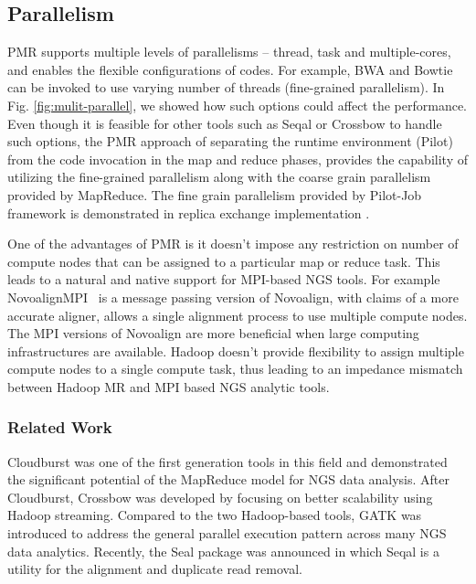 \documentclass{acm_proc_article-sp}
\begin{document}
\subsection{Parallelism} 
PMR supports multiple levels of parallelisms -- thread, task and
multiple-cores, and enables the flexible configurations of codes. For
example, BWA and Bowtie can be invoked to use varying number of
threads (fine-grained parallelism).  In Fig. \ref{fig:mulit-parallel},
we showed how such options could affect the performance.  Even
though it is feasible for other tools such as Seqal or Crossbow to
handle such options, the PMR approach of separating the runtime
environment (Pilot) from the code invocation in the map and reduce
phases, provides the capability of utilizing the fine-grained
parallelism along with the coarse grain parallelism provided by
MapReduce. The fine grain parallelism provided by Pilot-Job framework is demonstrated in replica exchange implementation \cite{repex_ptrsa}.

One of the advantages of PMR is it doesn't impose any restriction on
number of compute nodes that can be assigned to a particular map or
reduce task. This leads to a natural and native support for MPI-based
NGS tools. For example NovoalignMPI~\cite{novo-align} is a message
passing version of Novoalign, with claims of a more accurate aligner,
allows a single alignment process to use multiple compute nodes. The
MPI versions of Novoalign are more beneficial when large computing
infrastructures are available. Hadoop doesn't provide flexibility to
assign multiple compute nodes to a single compute task, thus leading
to an impedance mismatch between Hadoop MR and MPI based NGS analytic
tools.


\subsubsection*{Related Work}

Cloudburst was one of the first generation tools in this field and
demonstrated the significant potential of the MapReduce model for NGS
data analysis.  After Cloudburst, Crossbow was developed by focusing
on better scalability using Hadoop streaming.  Compared to the two
Hadoop-based tools, GATK was introduced to address the general
parallel execution pattern across many NGS data analytics.  Recently,
the Seal package was announced in which Seqal is a utility for the
alignment and duplicate read removal.
\end{document}
